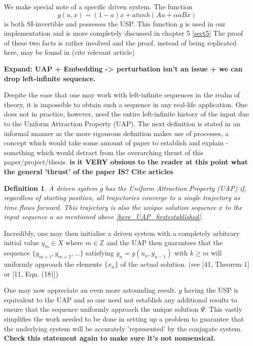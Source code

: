 \documentclass[12 pt]{article}
\newtheorem{Definition}{Definition}[]
\begin{document}
We make special note of a specific driven system. The function $$g(u,x)=(1-a)x+atanh(Au+\alpha{a}Bx)$$  is both SI-invertible and possesses the USP. This function $g$ is used in our implementation and is more completely discussed in chapter 5 \ref{sect5}
The proof of these two facts is rather involved and the proof, instead of being replicated here, may be found in (cite relevant article) 


\textbf{Expand: UAP + Embedding -> perturbation isn’t an issue + we can drop left-infinite sequence.  }

Despite the ease that one may work with left-infinite sequences in the realm of theory, it is impossible to obtain such a sequence in any real-life application.  One does not in practice, however, need the entire left-infinite history of the input due to the Uniform Attraction Property (UAP). The next definition is stated in an informal manner as the more rigourous definition makes use of processes, a concept which would take some amount of paper to establish and explain - something which would detract from the overarching thrust of this paper/project/thesis. \textbf{is it VERY obsious to the reader at this point what the general 'thrust' of the paper IS?} \textbf{Cite articles}

\begin{Definition}
  A driven system $g$ has the Uniform Attraction Property (UAP) if, regardless of starting position, all trajectories converge to a single trajectory as time flows forward. 
  This trajectory is also the unique solution sequence $x$ to the input sequence $u$ as mentioned above \ref{here_UAP_firstestablished}.
\end{Definition}

Incredibly, one may then initialise a driven system with a completely arbitrary initial value $y_m\in{X}$ where $m\in\mathbb{Z}$ and the UAP then guarantees that the sequence $\{y_{m+1}, y_{m+2},\ldots\}$ satisfying $y_n=g(u_n, y_{n-1})$  with $k\geq{m}$  will uniformly approach the elements $\{x_n\}$ of the actual solution. (see [41, Theorem 1] or [11, Eqn. (18)]) 
 
One may now appreciate an even more astounding result. $g$ having the USP is equivalent to the UAP and so one need not establish any additional results to ensure that the sequence uniformly approach the unique solution $\Psi$. This vastly simplifies the work needed to be done in setting up a problem to guarantee that the underlying system will be accurately 'represented' by the conjugate system. \textbf{Check this statement again to make sure it's not nonsensical.} 
\end{document}
